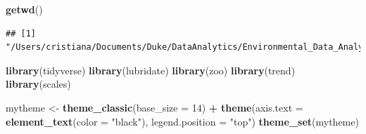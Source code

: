 \documentclass[]{article}
\newenvironment{Shaded}{\begin{snugshade}}{\end{snugshade}}
\newcommand{\DataTypeTok}[1]{\textcolor[rgb]{0.13,0.29,0.53}{#1}}
\newcommand{\DecValTok}[1]{\textcolor[rgb]{0.00,0.00,0.81}{#1}}
\newcommand{\KeywordTok}[1]{\textcolor[rgb]{0.13,0.29,0.53}{\textbf{#1}}}
\newcommand{\NormalTok}[1]{#1}
\newcommand{\OperatorTok}[1]{\textcolor[rgb]{0.81,0.36,0.00}{\textbf{#1}}}
\newcommand{\StringTok}[1]{\textcolor[rgb]{0.31,0.60,0.02}{#1}}
\begin{document}
\begin{Shaded}
\begin{Highlighting}[]
\KeywordTok{getwd}\NormalTok{()}
\end{Highlighting}
\end{Shaded}

\begin{verbatim}
## [1] "/Users/cristiana/Documents/Duke/DataAnalytics/Environmental_Data_Analytics_2020"
\end{verbatim}

\begin{Shaded}
\begin{Highlighting}[]
\KeywordTok{library}\NormalTok{(tidyverse)}
\KeywordTok{library}\NormalTok{(lubridate)}
\KeywordTok{library}\NormalTok{(zoo)}
\KeywordTok{library}\NormalTok{(trend)}
\KeywordTok{library}\NormalTok{(scales)}

\NormalTok{mytheme <-}\StringTok{ }\KeywordTok{theme_classic}\NormalTok{(}\DataTypeTok{base_size =} \DecValTok{14}\NormalTok{) }\OperatorTok{+}
\StringTok{  }\KeywordTok{theme}\NormalTok{(}\DataTypeTok{axis.text =} \KeywordTok{element_text}\NormalTok{(}\DataTypeTok{color =} \StringTok{"black"}\NormalTok{), }
        \DataTypeTok{legend.position =} \StringTok{"top"}\NormalTok{)}
\KeywordTok{theme_set}\NormalTok{(mytheme)}


\end{Highlighting}
\end{Shaded}
\end{document}
